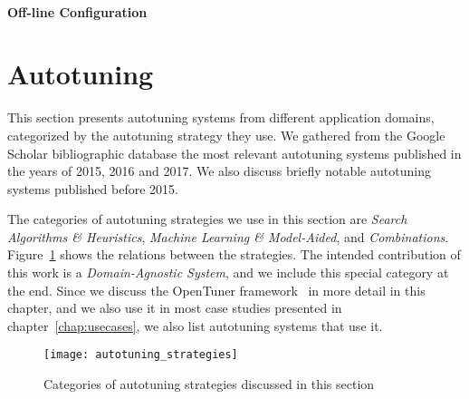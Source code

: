 \paragraph{Off-line Configuration}
\label{sec:offconfig}

%
%

\section{Autotuning}
\label{sec:autotuning}

This section presents autotuning systems from different application domains,
categorized by the autotuning strategy they use. We gathered from the Google
Scholar bibliographic database the most relevant autotuning systems published
in the years of 2015, 2016 and 2017. We also discuss briefly notable autotuning
systems published before 2015.

The categories of autotuning strategies we use in this section are
\textit{Search Algorithms \& Heuristics}, \textit{Machine Learning \&
Model-Aided}, and \textit{Combinations}. Figure~\ref{fig:strategies} shows the
relations between the strategies. The intended contribution of this work is a
\textit{Domain-Agnostic System}, and we include this special category at the
end. Since we discuss the OpenTuner framework~\cite{ansel2014opentuner} in more
detail in this chapter, and we also use it in most case studies presented in
chapter~\ref{chap:usecases}, we also list autotuning systems that use it.

\begin{figure}[htpb]
    \centering
    \texttt{[image: autotuning\_strategies]}
    \caption{Categories of autotuning strategies discussed in this section}
    \label{fig:strategies}
\end{figure}

